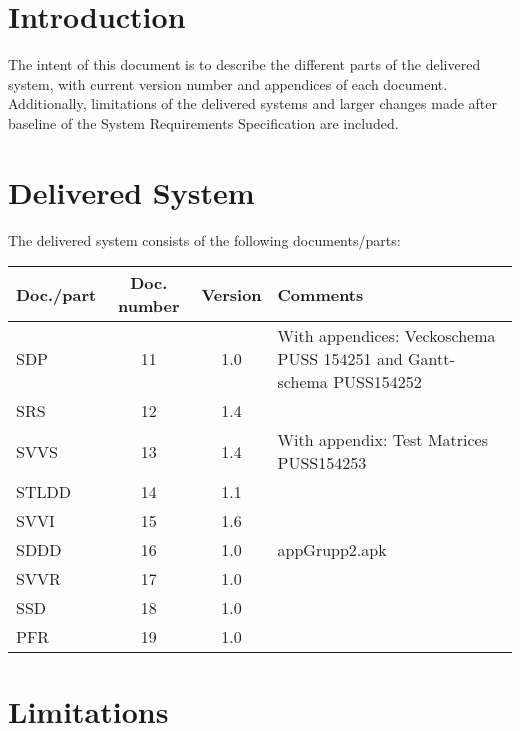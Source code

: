 \documentclass[a4paper]{article}
\begin{document}
\section{Introduction}

The intent of this document is to describe the different parts of the delivered system, with current version number and appendices of each document. Additionally, limitations of the delivered systems and larger changes made after baseline of the System Requirements Specification are included.



\section{Delivered System}

The delivered system consists of the following documents/parts:

\begin{center}
\begin{tabular}{| l | c | c | p{5cm} |}
    \hline
    \textbf{Doc./part} & \textbf{Doc. number} & \textbf{Version} & \textbf{Comments} \\ \hline
    SDP & 11 & 1.0 & With appendices: Veckoschema PUSS 154251 and Gantt-schema PUSS154252 \\ \hline
    SRS & 12 & 1.4 & \\ \hline
    SVVS & 13 & 1.4 & With appendix: Test Matrices PUSS154253 \\ \hline
    STLDD & 14 & 1.1 & \\ \hline
    SVVI & 15 & 1.6 & \\ \hline
    SDDD & 16 & 1.0 & appGrupp2.apk\\ \hline
    SVVR & 17 & 1.0 & \\ \hline
    SSD & 18 & 1.0 & \\ \hline
    PFR & 19 & 1.0 & \\ \hline

\end{tabular}
\end{center}

\section{Limitations}
\end{document}
